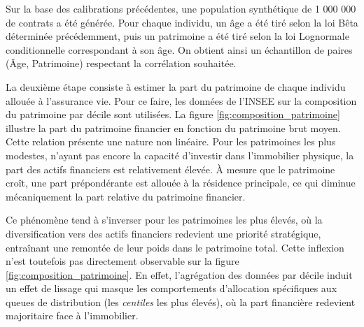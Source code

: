 Sur la base des calibrations précédentes, une population synthétique de 1 000 000 de contrats a été générée. Pour chaque individu, un âge a été tiré selon la loi Bêta déterminée précédemment, puis un patrimoine a été tiré selon la loi Lognormale conditionnelle correspondant à son âge. On obtient ainsi un échantillon de paires (Âge, Patrimoine) respectant la corrélation souhaitée.

La deuxième étape consiste à estimer la part du patrimoine de chaque individu allouée à l'assurance vie. Pour ce faire, les données de l'INSEE sur la composition du patrimoine par décile \cite{insee_patrimoine_age} sont utilisées. La figure \ref{fig:composition_patrimoine} illustre la part du patrimoine financier en fonction du patrimoine brut moyen. Cette relation présente une nature non linéaire. Pour les patrimoines les plus modestes, n'ayant pas encore la capacité d'investir dans l'immobilier physique, la part des actifs financiers est relativement élevée. À mesure que le patrimoine croît, une part prépondérante est allouée à la résidence principale, ce qui diminue mécaniquement la part relative du patrimoine financier. 

Ce phénomène tend à s'inverser pour les patrimoines les plus élevés, où la diversification vers des actifs financiers redevient une priorité stratégique, entraînant une remontée de leur poids dans le patrimoine total. Cette inflexion n'est toutefois pas directement observable sur la figure \ref{fig:composition_patrimoine}. En effet, l'agrégation des données par décile induit un effet de lissage qui masque les comportements d'allocation spécifiques aux queues de distribution (les \textit{centiles} les plus élevés), où la part financière redevient majoritaire face à l'immobilier.

